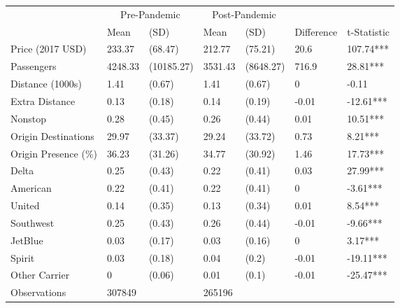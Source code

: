 
\begin{tabular}[t]{lllllll}
\toprule
\multicolumn{1}{c}{ } & \multicolumn{2}{c}{Pre-Pandemic} & \multicolumn{2}{c}{Post-Pandemic} & \multicolumn{2}{c}{ } \\
\cmidrule(l{3pt}r{3pt}){2-3} \cmidrule(l{3pt}r{3pt}){4-5}
 & Mean & (SD) & Mean & (SD) & Difference & t-Statistic\\
\midrule
Price (2017 USD) & 233.37 & (68.47) & 212.77 & (75.21) & 20.6 & 107.74***\\
Passengers & 4248.33 & (10185.27) & 3531.43 & (8648.27) & 716.9 & 28.81***\\
Distance (1000s) & 1.41 & (0.67) & 1.41 & (0.67) & 0 & -0.11\\
Extra Distance & 0.13 & (0.18) & 0.14 & (0.19) & -0.01 & -12.61***\\
Nonstop & 0.28 & (0.45) & 0.26 & (0.44) & 0.01 & 10.51***\\
\addlinespace
Origin Destinations & 29.97 & (33.37) & 29.24 & (33.72) & 0.73 & 8.21***\\
Origin Presence (\%) & 36.23 & (31.26) & 34.77 & (30.92) & 1.46 & 17.73***\\
Delta & 0.25 & (0.43) & 0.22 & (0.41) & 0.03 & 27.99***\\
American & 0.22 & (0.41) & 0.22 & (0.41) & 0 & -3.61***\\
United & 0.14 & (0.35) & 0.13 & (0.34) & 0.01 & 8.54***\\
\addlinespace
Southwest & 0.25 & (0.43) & 0.26 & (0.44) & -0.01 & -9.66***\\
JetBlue & 0.03 & (0.17) & 0.03 & (0.16) & 0 & 3.17***\\
Spirit & 0.03 & (0.18) & 0.04 & (0.2) & -0.01 & -19.11***\\
Other Carrier & 0 & (0.06) & 0.01 & (0.1) & -0.01 & -25.47***\\
Observations & 307849 &  & 265196 &  &  & \\
\bottomrule
\end{tabular}
